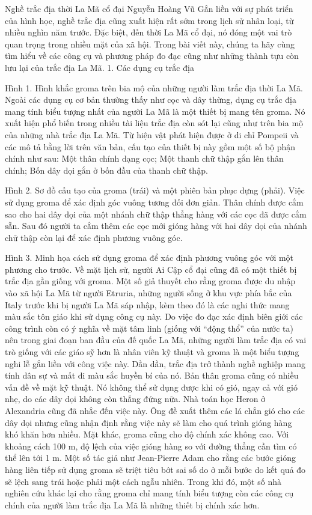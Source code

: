 \vspace*{188pt}
\begin{multicols}{2}
	Nghề trắc địa thời La Mã cổ đại
	Nguyễn Hoàng Vũ
	Gắn liền với sự phát triển của hình học, nghề trắc địa cũng xuất hiện rất sớm trong lịch sử nhân loại, từ nhiều nghìn năm trước. Đặc biệt, đến thời La Mã cổ đại, nó đóng một vai trò quan trọng trong nhiều mặt của xã hội. Trong bài viết này, chúng ta hãy cùng tìm hiểu về các công cụ và phương pháp đo đạc cũng như những thành tựu còn lưu lại của trắc địa La Mã.
	1. Các dụng cụ trắc địa
	
	Hình 1. Hình khắc groma trên bia mộ của những người làm trắc địa thời La Mã.
	Ngoài các dụng cụ cơ bản thường thấy như cọc và dây thừng, dụng cụ trắc địa mang tính biểu tượng nhất của người La Mã là một thiết bị mang tên groma. Nó xuất hiện phổ biến trong nhiều tài liệu trắc địa còn sót lại cũng như trên bia mộ của những nhà trắc địa La Mã. Từ hiện vật phát hiện được ở di chỉ Pompeii và các mô tả bằng lời trên văn bản, cấu tạo của thiết bị này gồm một số bộ phận chính như sau:
	Một thân chính dạng cọc;
	Một thanh chữ thập gắn lên thân chính;
	Bốn dây dọi gắn ở bốn đầu của thanh chữ thập.
	
	Hình 2. Sơ đồ cấu tạo của groma (trái) và một phiên bản phục dựng (phải).
	Việc sử dụng groma để xác định góc vuông tương đối đơn giản. Thân chính được cắm sao cho hai dây dọi của một nhánh chữ thập  thẳng hàng với các cọc đã được cắm sẵn. Sau đó người ta cắm thêm các cọc mới gióng hàng với hai dây dọi của nhánh chữ thập còn lại để xác định phương vuông góc.
	
	
	Hình 3. Minh họa cách sử dụng groma để xác định phương vuông góc với một phương cho trước. 
	Về mặt lịch sử, người Ai Cập cổ đại cũng đã có một thiết bị trắc địa gần giống với groma. Một số giả thuyết cho rằng groma được du nhập vào xã hội La Mã từ người Etruria, những người sống ở khu vực phía bắc của Italy trước khi bị người La Mã sáp nhập, kèm theo đó là các nghi thức mang màu sắc tôn giáo khi sử dụng công cụ này. Do việc đo đạc xác định biên giới các công trình còn có ý nghĩa về mặt tâm linh (giống với “động thổ” của nước ta) nên trong giai đoạn ban đầu của đế quốc La Mã, những người làm trắc địa có vai trò giống với các giáo sỹ hơn là nhân viên kỹ thuật và groma là một biểu tượng nghi lễ gắn liền với công việc này. Dần dần, trắc địa trở thành nghề nghiệp mang tính dân sự và mất đi màu sắc huyền bí của nó.
	Bản thân groma cũng có nhiều vấn đề về mặt kỹ thuật. Nó không thể sử dụng được khi có gió, ngay cả với gió nhẹ, do các dây dọi không còn thẳng đứng nữa. Nhà toán học Heron ở Alexandria cũng đã nhắc đến việc này. Ông đề xuất thêm các lá chắn gió cho các dây dọi nhưng cũng nhận định rằng việc này sẽ làm cho quá trình gióng hàng khó khăn hơn nhiều. Mặt khác, groma cũng cho độ chính xác không cao. Với khoảng cách 100 m, độ lệch của việc gióng hàng so với đường thẳng cần tìm có thể lên tới 1 m. Một số tác giả như Jean-Pierre Adam cho rằng các bước gióng hàng liên tiếp sử dụng groma sẽ triệt tiêu bớt sai số do ở mỗi bước do kết quả đo sẽ lệch sang trái hoặc phải một cách ngẫu nhiên. Trong khi đó, một số nhà nghiên cứu khác lại cho rằng groma chỉ mang tính biểu tượng còn các công cụ chính của người làm trắc địa La Mã là những thiết bị chính xác hơn.
	

\end{multicols}
